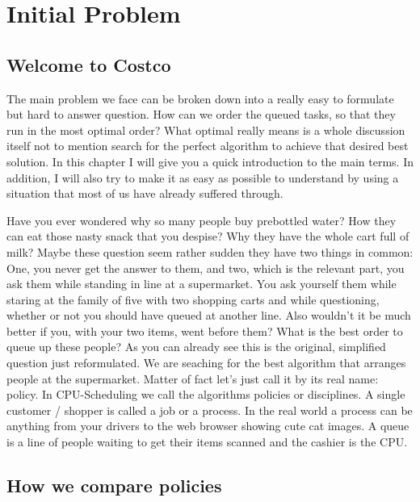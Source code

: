 \chapter{Initial Problem}

\section{Welcome to Costco}

The main problem we face can be broken down into a really easy to formulate but hard to answer question.
How can we order the queued tasks, so that they run in the most optimal order?
What optimal really means is a whole discussion itself not to mention search for the perfect algorithm to achieve that desired best solution.
In this chapter I will give you a quick introduction to the main terms.
In addition, I will also try to make it as easy as possible to understand by using a situation that most of us have already suffered through.

Have you ever wondered why so many people buy prebottled water? 
How they can eat those nasty snack that you despise?
Why they have the whole cart full of milk?
Maybe these question seem rather sudden they have two things in common:
One, you never get the answer to them, and two, which is the relevant part, you ask them while standing in line at a supermarket.
You ask yourself them while staring at the family of five with two shopping carts and while questioning, whether or not you should have queued at another line.
Also wouldn't it be much better if you, with your two items, went before them?
What is the best order to queue up these people?
As you can already see this is the original, simplified question just reformulated.
We are seaching for the best algorithm that arranges people at the supermarket.
Matter of fact let's just call it by its real name: policy.
In CPU-Scheduling we call the algorithms policies or disciplines.
A single customer / shopper is called a job or a process.
In the real world a process can be anything from your drivers to the web browser showing cute cat images.
A queue is a line of people waiting to get their items scanned and the cashier is the CPU.

\section{How we compare policies}


